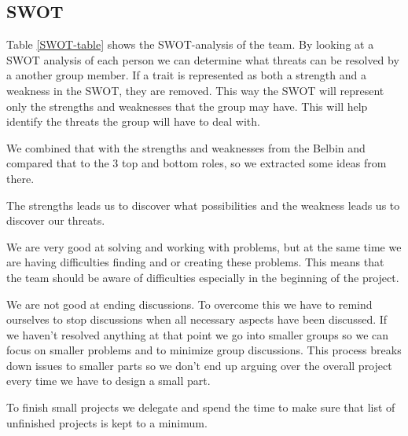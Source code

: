 \subsection{SWOT}

Table \ref{SWOT-table} shows the SWOT-analysis of the team. 
By looking at a SWOT analysis of each person we can determine what threats can be resolved by a another group member.
If a trait is represented as both a strength and a weakness in the SWOT, they are removed. This way the SWOT will represent only the strengths and weaknesses that the group may have. This will help identify the threats the group will have to deal with.

We combined that with the strengths and weaknesses from the Belbin and compared that to the 3 top and bottom roles, so we extracted some ideas from there.

The strengths leads us to discover what possibilities and the weakness leads us to discover our threats. 

We are very good at solving and working with problems, but at the same time we are having difficulties finding and or creating these problems. 
This means that the team should be aware of difficulties especially in the beginning of the project.

We are not good at ending discussions.
To overcome this we have to remind ourselves to stop discussions when all necessary aspects have been discussed.
If we haven't resolved anything at that point we go into smaller groups so we can focus on smaller problems and to minimize group discussions.
This process breaks down issues to smaller parts so we don't end up arguing over the overall project every time we have to design a small part.

To finish small projects we delegate and spend the time to make sure that list of unfinished projects is kept to a minimum. 

